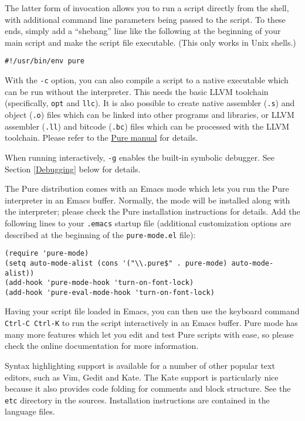 \documentclass[a4paper,12pt]{article}
\begin{document}
The latter form of invocation allows you to run a script directly from the shell, with additional command line parameters being passed to the script. To these ends, simply add a ``shebang'' line like the following at the beginning of your main script and make the script file executable. (This only works in Unix shells.)

\begin{lstlisting}
#!/usr/bin/env pure
\end{lstlisting}

With the \verb|-c| option, you can also compile a script to a native executable which can be run without the interpreter. This needs the basic LLVM toolchain (specifically, \texttt{opt} and \texttt{llc}). It is also possible to create native assembler (\texttt{.s}) and object (\texttt{.o}) files which can be linked into other programs and libraries, or LLVM assembler (\texttt{.ll}) and bitcode (\texttt{.bc}) files which can be processed with the LLVM toolchain. Please refer to the \href{https://agraef.github.io/pure-docs/pure.html#batch-compilation}{Pure manual} for details.

When running interactively, \verb|-g| enables the built-in symbolic debugger. See Section \ref{Debugging} below for details.

The Pure distribution comes with an Emacs mode which lets you run the Pure interpreter in an Emacs buffer. Normally, the mode will be installed along with the interpreter; please check the Pure installation instructions for details. Add the following lines to your \texttt{.emacs} startup file (additional customization options are described at the beginning of the \texttt{pure-mode.el} file):

\begin{verbatim}
(require 'pure-mode)
(setq auto-mode-alist (cons '("\\.pure$" . pure-mode) auto-mode-alist))
(add-hook 'pure-mode-hook 'turn-on-font-lock)
(add-hook 'pure-eval-mode-hook 'turn-on-font-lock)
\end{verbatim}

Having your script file loaded in Emacs, you can then use the keyboard command \texttt{Ctrl-C Ctrl-K} to run the script interactively in an Emacs buffer. Pure mode has many more features which let you edit and test Pure scripts with ease, so please check the online documentation for more information.

Syntax highlighting support is available for a number of other popular text editors, such as Vim, Gedit and Kate. The Kate support is particularly nice because it also provides code folding for comments and block structure. See the \texttt{etc} directory in the sources. Installation instructions are contained in the language files.
\end{document}
